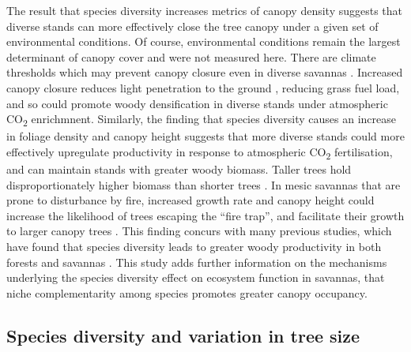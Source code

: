 \begin{refsection}
The result that species diversity increases metrics of canopy density suggests that diverse stands can more effectively close the tree canopy under a given set of environmental conditions. Of course, environmental conditions remain the largest determinant of canopy cover and were not measured here. There are climate thresholds which may prevent canopy closure even in diverse savannas \citep{Devine2017}. Increased canopy closure reduces light penetration to the ground \citep{Pilon2020}, reducing grass fuel load, and so could promote woody densification in diverse stands under atmospheric CO\textsubscript{2} enrichmnent. Similarly, the finding that species diversity causes an increase in foliage density and canopy height suggests that more diverse stands could more effectively upregulate productivity in response to atmospheric CO\textsubscript{2} fertilisation, and can maintain stands with greater woody biomass. Taller trees hold disproportionately higher biomass than shorter trees \citep{King1990}. In mesic savannas that are prone to disturbance by fire, increased growth rate and canopy height could increase the likelihood of trees escaping the ``fire trap'', and facilitate their growth to larger canopy trees \citep{Wakeling2011}. This finding concurs with many previous studies, which have found that species diversity leads to greater woody productivity in both forests and savannas \citep{Plas2019, Liang2016}. This study adds further information on the mechanisms underlying the species diversity effect on ecosystem function in savannas, that niche complementarity among species promotes greater canopy occupancy.

\subsection{Species diversity and variation in tree size}
\label{tls:ssec:diversity}


\end{refsection}
